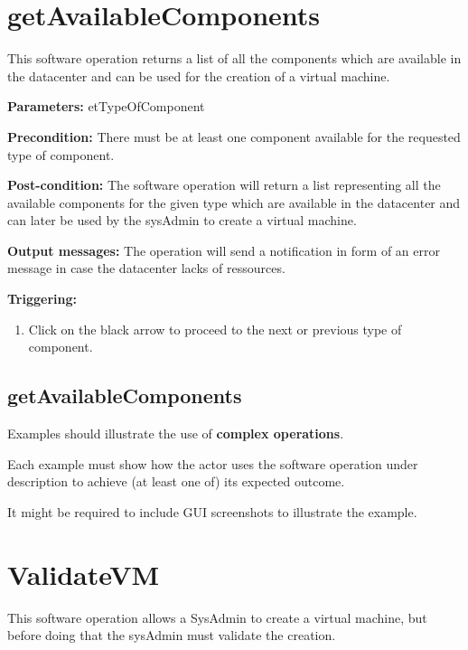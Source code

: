 \section{getAvailableComponents}
\label{operation:getAvailableComponents}
This software operation returns a list of all the components which are available
in the datacenter and can be used for the creation of a virtual machine.
\begin{description}

\item \textbf{Parameters:} etTypeOfComponent
\item \textbf{Precondition:} There must be at least one component available for
the requested type of component.
\item \textbf{Post-condition:} The software operation will return a list
representing all the available components for the given type which are available
in the datacenter and can later be used by the sysAdmin to create a virtual machine.

\item \textbf{Output messages:} The operation will send a notification in form
of an error message in case the datacenter lacks of ressources.

\item \textbf{Triggering:}
\begin{enumerate}
\item Click on the black arrow to proceed to the next or previous type of
component.
\end{enumerate}

 
\end{description}

\subsection{getAvailableComponents}
Examples should illustrate the use of \textbf{complex operations}.

Each example must show how the actor uses the software operation under
description to achieve (at least one of) its expected outcome.

It might be required to include GUI screenshots to illustrate the example.







\section{ValidateVM}
\label{operation:ValidateVM}
This software operation allows a SysAdmin to create a virtual machine, but
before doing that the sysAdmin must validate the creation.

